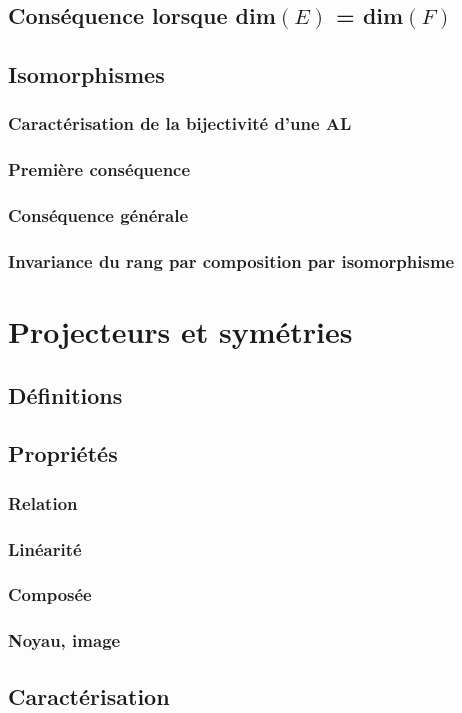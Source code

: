 \documentclass[12pt,a4paper,french]{book}
\begin{document}
		\subsection{Conséquence lorsque dim$(E)$ = dim$(F)$}
		\subsection{Isomorphismes}
			\subsubsection{Caractérisation de la bijectivité d'une AL}
			\subsubsection{Première conséquence}
			\subsubsection{Conséquence générale}
			\subsubsection{Invariance du rang par composition par isomorphisme}
	\section{Projecteurs et symétries}
		\subsection{Définitions}
		\subsection{Propriétés}
			\subsubsection{Relation}
			\subsubsection{Linéarité}
			\subsubsection{Composée}
			\subsubsection{Noyau, image}
		\subsection{Caractérisation}
\end{document}
